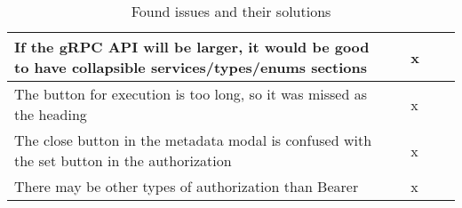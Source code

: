 \begin{table}[hbt!]
\begin{tabular}{|l|l|l|l|l|}
        \hline
        If the gRPC API will be larger, it would be good to have collapsible services/types/enums sections & & x \\
        \hline
        The button for execution is too long, so it was missed as the heading                                                                         &                                   & x     \\
        \hline
        The close button in the metadata modal is confused with the set button in the authorization                                                                         &                                   & x     \\
        \hline
        There may be other types of authorization than Bearer                                                                                         &                                   & x     \\
        \hline
    \end{tabular}
    \caption{Found issues and their solutions}
    \label{tab:user-testing-issues}
\end{table}